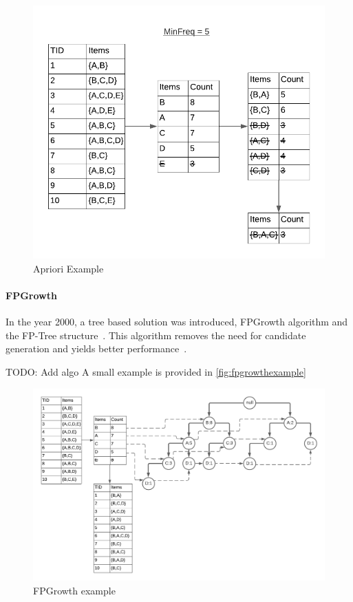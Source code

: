 \begin{figure}[H]
  \centering
  \includegraphics[width=\linewidth]{figures/aprioriexample}
  \caption{Apriori Example}
  \label{fig:aprioriexample}
\end{figure}


\paragraph{FPGrowth}
In the year 2000, a tree based solution was introduced, FPGrowth algorithm and the FP-Tree structure~\cite{agrawal1994fast}. This algorithm removes the need for candidate generation and yields better performance~\cite{hunyadi2011performance}. 

TODO: Add algo
A small example is provided in \autoref{fig:fpgrowthexample}

\begin{figure}[H]
  \centering
  \includegraphics[width=\linewidth]{figures/FPTree}
  \caption{FPGrowth example}
  \label{fig:fpgrowthexample}
\end{figure}

